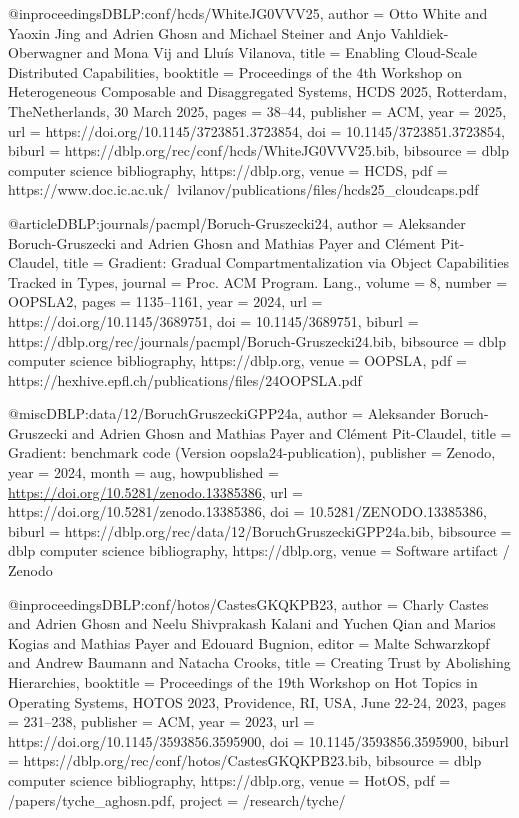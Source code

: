 @inproceedings{DBLP:conf/hcds/WhiteJG0VVV25,
  author = {Otto White and Yaoxin Jing and Adrien Ghosn and Michael Steiner and Anjo Vahldiek-Oberwagner and Mona Vij and Lluís Vilanova},
  title = {Enabling Cloud-Scale Distributed Capabilities},
  booktitle = {Proceedings of the 4th Workshop on Heterogeneous Composable and Disaggregated Systems, HCDS 2025, Rotterdam, TheNetherlands, 30 March 2025},
  pages = {38--44},
  publisher = {ACM},
  year = {2025},
  url = {https://doi.org/10.1145/3723851.3723854},
  doi = {10.1145/3723851.3723854},
  biburl = {https://dblp.org/rec/conf/hcds/WhiteJG0VVV25.bib},
  bibsource = {dblp computer science bibliography, https://dblp.org},
  venue = {HCDS},
  pdf = {https://www.doc.ic.ac.uk/~lvilanov/publications/files/hcds25_cloudcaps.pdf}
}

@article{DBLP:journals/pacmpl/Boruch-Gruszecki24,
  author = {Aleksander Boruch-Gruszecki and Adrien Ghosn and Mathias Payer and Clément Pit-Claudel},
  title = {Gradient: Gradual Compartmentalization via Object Capabilities Tracked in Types},
  journal = {Proc. ACM Program. Lang.},
  volume = {8},
  number = {OOPSLA2},
  pages = {1135--1161},
  year = {2024},
  url = {https://doi.org/10.1145/3689751},
  doi = {10.1145/3689751},
  biburl = {https://dblp.org/rec/journals/pacmpl/Boruch-Gruszecki24.bib},
  bibsource = {dblp computer science bibliography, https://dblp.org},
  venue = {OOPSLA},
  pdf = {https://hexhive.epfl.ch/publications/files/24OOPSLA.pdf}
}

@misc{DBLP:data/12/BoruchGruszeckiGPP24a,
  author = {Aleksander Boruch-Gruszecki and Adrien Ghosn and Mathias Payer and Clément Pit-Claudel},
  title = {Gradient: benchmark code (Version oopsla24-publication)},
  publisher = {Zenodo},
  year = {2024},
  month = aug,
  howpublished = {\url{https://doi.org/10.5281/zenodo.13385386}},
  url = {https://doi.org/10.5281/zenodo.13385386},
  doi = {10.5281/ZENODO.13385386},
  biburl = {https://dblp.org/rec/data/12/BoruchGruszeckiGPP24a.bib},
  bibsource = {dblp computer science bibliography, https://dblp.org},
  venue = {Software artifact / Zenodo}
}

@inproceedings{DBLP:conf/hotos/CastesGKQKPB23,
  author = {Charly Castes and Adrien Ghosn and Neelu Shivprakash Kalani and Yuchen Qian and Marios Kogias and Mathias Payer and Edouard Bugnion},
  editor = {Malte Schwarzkopf and Andrew Baumann and Natacha Crooks},
  title = {Creating Trust by Abolishing Hierarchies},
  booktitle = {Proceedings of the 19th Workshop on Hot Topics in Operating Systems, HOTOS 2023, Providence, RI, USA, June 22-24, 2023},
  pages = {231--238},
  publisher = {ACM},
  year = {2023},
  url = {https://doi.org/10.1145/3593856.3595900},
  doi = {10.1145/3593856.3595900},
  biburl = {https://dblp.org/rec/conf/hotos/CastesGKQKPB23.bib},
  bibsource = {dblp computer science bibliography, https://dblp.org},
  venue = {HotOS},
  pdf = {/papers/tyche_aghosn.pdf},
  project = {/research/tyche/}
}

